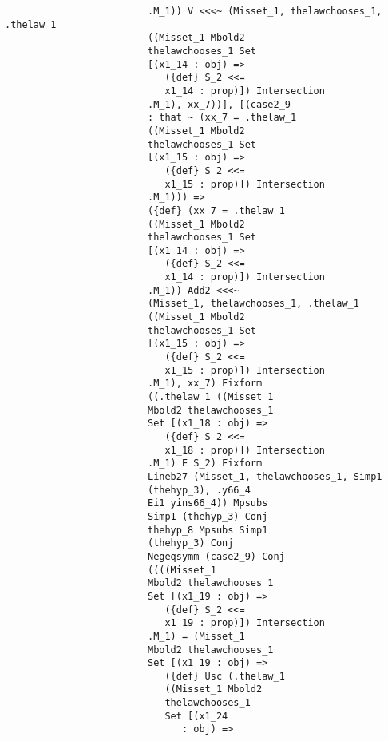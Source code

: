\documentclass{article}
\begin{document}
\begin{verbatim}
                         .M_1)) V <<<~ (Misset_1, thelawchooses_1, .thelaw_1 
                         ((Misset_1 Mbold2 
                         thelawchooses_1 Set 
                         [(x1_14 : obj) => 
                            ({def} S_2 <<= 
                            x1_14 : prop)]) Intersection 
                         .M_1), xx_7))], [(case2_9 
                         : that ~ (xx_7 = .thelaw_1 
                         ((Misset_1 Mbold2 
                         thelawchooses_1 Set 
                         [(x1_15 : obj) => 
                            ({def} S_2 <<= 
                            x1_15 : prop)]) Intersection 
                         .M_1))) => 
                         ({def} (xx_7 = .thelaw_1 
                         ((Misset_1 Mbold2 
                         thelawchooses_1 Set 
                         [(x1_14 : obj) => 
                            ({def} S_2 <<= 
                            x1_14 : prop)]) Intersection 
                         .M_1)) Add2 <<<~ 
                         (Misset_1, thelawchooses_1, .thelaw_1 
                         ((Misset_1 Mbold2 
                         thelawchooses_1 Set 
                         [(x1_15 : obj) => 
                            ({def} S_2 <<= 
                            x1_15 : prop)]) Intersection 
                         .M_1), xx_7) Fixform 
                         ((.thelaw_1 ((Misset_1 
                         Mbold2 thelawchooses_1 
                         Set [(x1_18 : obj) => 
                            ({def} S_2 <<= 
                            x1_18 : prop)]) Intersection 
                         .M_1) E S_2) Fixform 
                         Lineb27 (Misset_1, thelawchooses_1, Simp1 
                         (thehyp_3), .y66_4 
                         Ei1 yins66_4)) Mpsubs 
                         Simp1 (thehyp_3) Conj 
                         thehyp_8 Mpsubs Simp1 
                         (thehyp_3) Conj 
                         Negeqsymm (case2_9) Conj 
                         ((((Misset_1 
                         Mbold2 thelawchooses_1 
                         Set [(x1_19 : obj) => 
                            ({def} S_2 <<= 
                            x1_19 : prop)]) Intersection 
                         .M_1) = (Misset_1 
                         Mbold2 thelawchooses_1 
                         Set [(x1_19 : obj) => 
                            ({def} Usc (.thelaw_1 
                            ((Misset_1 Mbold2 
                            thelawchooses_1 
                            Set [(x1_24 
                               : obj) => 

\end{verbatim}
\end{document}
